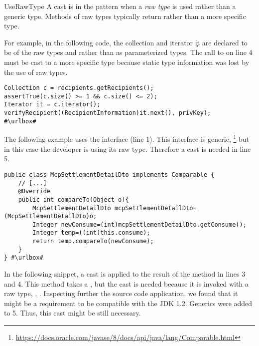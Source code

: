 \begin{pattern}{UseRawType}
A cast is in the \thisp{} pattern when a \emph{raw type} is used rather than a generic type.
Methods of raw types typically return  rather than a more specific type.

\instances{}
For example, in the following code,
the collection  and iterator \c{it} are declared to be of the raw types  and  rather than as parameterized types.
The call to  on line 4 must be cast to a more specific type because static type information was lost by the use of raw types.

\def\urlvar{http://bit.ly/bcgit_bc_java_2SD2HLm}
\begin{verbatim}
Collection c = recipients.getRecipients();
assertTrue(c.size() >= 1 && c.size() <= 2);
Iterator it = c.iterator();
verifyRecipient((RecipientInformation)it.next(), privKey);
#\urlbox#
\end{verbatim}

The following example uses the  interface (line 1).
This interface is generic,%
\footnote{\url{https://docs.oracle.com/javase/8/docs/api/java/lang/Comparable.html}}
but in this case the developer is using its raw type.
Therefore a cast is needed in line 5.

\def\urlvar{http://bit.ly/fangjie008_tiexue_mcp_parent_2FSZKzm}
\begin{verbatim}
public class McpSettlementDetailDto implements Comparable {
    // [...]
    @Override
    public int compareTo(Object o){
        McpSettlementDetailDto mcpSettlementDetailDto=(McpSettlementDetailDto)o;
        Integer newConsume=(int)mcpSettlementDetailDto.getConsume();
        Integer temp=((int)this.consume);
        return temp.compareTo(newConsume);
    }
} #\urlbox#
\end{verbatim}


In the following snippet,
a cast is applied to the result of the  method in lines 3 and 4.
This method takes a ,
but the cast is needed because it is invoked with a raw type,
\eg{}, .
Inspecting further the source code application,
we found that it might be a requirement to be compatible with the JDK 1.2.
Generics were added to \java{} 5.
Thus, this cast might be still necessary.


\end{pattern}
